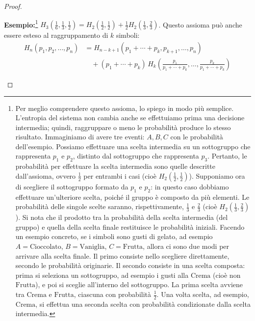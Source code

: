 \documentclass{article}
\theoremstyle{definition}
\numberwithin{equation}{section}
\begin{document}
\begin{proof}
\begin{enumerate}
              \textbf{Esempio:}\footnote{Per meglio comprendere questo assioma, lo spiego in modo più semplice. L'entropia del sistema non cambia anche se effettuiamo prima una decisione intermedia; quindi, raggruppare o meno le probabilità produce lo stesso risultato. Immaginiamo di avere tre eventi: $A, B, C$ con le probabilità dell'esempio. Possiamo effettuare una scelta intermedia su un sottogruppo che rappresenta $p_1$ e $p_2$, distinto dal sottogruppo che rappresenta $p_3$. Pertanto, le probabilità per effettuare la scelta intermedia sono quelle descritte dall'assioma, ovvero $\frac{1}{2}$ per entrambi i casi (cioè $H_2(\frac{1}{2}, \frac{1}{2})$). Supponiamo ora di scegliere il sottogruppo formato da $p_1$ e $p_2$: in questo caso dobbiamo effettuare un'ulteriore scelta, poiché il gruppo è composto da più elementi. Le probabilità delle singole scelte saranno, rispettivamente, $\frac{1}{3}$ e $\frac{2}{3}$ (cioè $H_2(\frac{1}{3}, \frac{2}{3})$). Si nota che il prodotto tra la probabilità della scelta intermedia (del gruppo) e quella della scelta finale restituisce le probabilità iniziali. Facendo un esempio concreto, se i simboli sono gusti di gelato, ad esempio $A=\text{Cioccolato}$, $B=\text{Vaniglia}$, $C=\text{Frutta}$, allora ci sono due modi per arrivare alla scelta finale. Il primo consiste nello scegliere direttamente, secondo le probabilità originarie. Il secondo consiste in una scelta composta: prima si seleziona un sottogruppo, ad esempio i gusti alla $\text{Crema}$ (cioè non $\text{Frutta}$), e poi si sceglie all'interno del sottogruppo. La prima scelta avviene tra $\text{Crema}$ e $\text{Frutta}$, ciascuna con probabilità $\frac{1}{2}$. Una volta scelta, ad esempio, $\text{Crema}$, si effettua una seconda scelta con probabilità condizionate dalla scelta intermedia.} $H_3(\frac{1}{6},\frac{1}{3},\frac{1}{2})=H_2(\frac{1}{2},\frac{1}{2})+\frac{1}{2}H_2(\frac{1}{3},\frac{2}{3})$. Questo assioma può anche essere esteso al raggruppamento di $k$ simboli:
              \begin{equation}
                  \begin{split}
                      H_n(p_1, p_2, \ldots, p_n)
                       & = H_{n-k+1}(p_1 + \cdots + p_k, p_{k+1}, \ldots, p_n) \\
                       & \quad + (p_1 + \cdots + p_k)\, H_k\left(
                      \frac{p_1}{p_1 + \cdots + p_k}, \ldots, \frac{p_k}{p_1 + \cdots + p_k}
                      \right)
                  \end{split}
              \end{equation}

\end{enumerate}
\end{proof}
\end{document}

